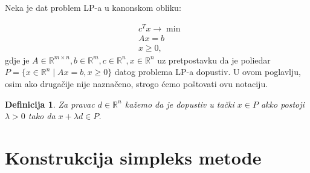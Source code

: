 \documentclass[a4paper, utf8, 11pt, colorlinks]{book}
\newtheorem{definition}{Definicija}
\begin{document}
Neka je dat problem LP-a u kanonskom obliku:

\begin{align}
    &c^Tx \rightarrow \min \nonumber \\ 
    & A x = b \nonumber \\
     & x \geq 0, \label{eq:lp_equality_constraint}
\end{align}
gdje je $A \in \mathbb{R}^{m \times n}, b \in \mathbb{R}^m, c \in \mathbb{R}^n, x\in \mathbb{R}^n$ uz pretpostavku da je poliedar $P=\{ x \in \mathbb{R}^n \mid A x = b , x \geq 0 \}$ datog problema LP-a dopustiv.  U ovom poglavlju, osim ako drugačije nije naznačeno, strogo ćemo poštovati ovu notaciju. 


\begin{definition}
      Za pravac $d\in \mathbb{R}^n$ kažemo da je dopustiv u tački $x \in P$ akko postoji $\lambda > 0$ tako da $x + \lambda d \in P$.
\end{definition}

\section{Konstrukcija simpleks metode}
\end{document}
